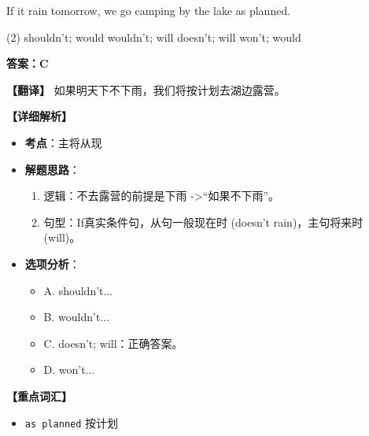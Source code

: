 \documentclass[11pt, a4paper]{article}
\newcommand{\analysis}[4]{
    \begin{solutionbox}
        \textbf{答案：#1}
        
        \textbf{【翻译】} #2
        
        \textbf{【详细解析】}
        #3
        
        \textbf{【重点词汇】}
        #4
    \end{solutionbox}
}
\newcommand{\blank}{\underline{\hspace{1.5cm}}}
\begin{document}
\begin{questions}
    \item If it \blank rain tomorrow, we \blank go camping by the lake as planned.
    \begin{tasks}(2)
        \task shouldn’t; would \task wouldn’t; will
        \task doesn’t; will \task won’t; would
    \end{tasks}
    \analysis{C}{如果明天下不下雨，我们将按计划去湖边露营。}{
        \begin{itemize}
            \item \textbf{考点}：主将从现
            \item \textbf{解题思路}：
                \begin{enumerate}
                    \item 逻辑：不去露营的前提是下雨 ->“如果不下雨”。
                    \item 句型：If真实条件句，从句一般现在时 (doesn't rain)，主句将来时 (will)。
                \end{enumerate}
            \item \textbf{选项分析}：
                \begin{itemize}
                    \item A. shouldn’t...
                    \item B. wouldn’t...
                    \item C. doesn’t; will：正确答案。
                    \item D. won’t...
                \end{itemize}
        \end{itemize}
    }{
        \begin{itemize}
            \item \texttt{as planned} 按计划
        \end{itemize}
    }


\end{questions}
\end{document}
